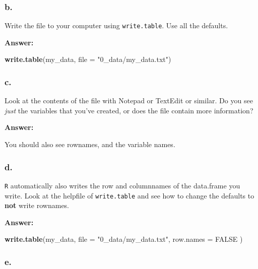\documentclass[]{article}
\newenvironment{Shaded}{\begin{snugshade}}{\end{snugshade}}
\newcommand{\DataTypeTok}[1]{\textcolor[rgb]{0.13,0.29,0.53}{#1}}
\newcommand{\KeywordTok}[1]{\textcolor[rgb]{0.13,0.29,0.53}{\textbf{#1}}}
\newcommand{\NormalTok}[1]{#1}
\newcommand{\OtherTok}[1]{\textcolor[rgb]{0.56,0.35,0.01}{#1}}
\newcommand{\StringTok}[1]{\textcolor[rgb]{0.31,0.60,0.02}{#1}}
\begin{document}
\hypertarget{b.-4}{%
\subsubsection{b.}\label{b.-4}}

Write the file to your computer using \texttt{write.table}. Use all the
defaults.

\textbf{Answer:}

\begin{Shaded}
\begin{Highlighting}[]
\KeywordTok{write.table}\NormalTok{(my_data, }\DataTypeTok{file =} \StringTok{"0_data/my_data.txt"}\NormalTok{)}
\end{Highlighting}
\end{Shaded}

\hypertarget{c.-4}{%
\subsubsection{c.}\label{c.-4}}

Look at the contents of the file with Notepad or TextEdit or similar. Do
you see \emph{just} the variables that you've created, or does the file
contain more information?

\textbf{Answer:}

You should also see rownames, and the variable names.

\hypertarget{d.-4}{%
\subsubsection{d.}\label{d.-4}}

\texttt{R} automatically also writes the row and columnnames of the
data.frame you write. Look at the helpfile of \texttt{write.table} and
see how to change the defaults to \textbf{not} write rownames.

\textbf{Answer:}

\begin{Shaded}
\begin{Highlighting}[]
\KeywordTok{write.table}\NormalTok{(my_data, }
            \DataTypeTok{file =} \StringTok{"0_data/my_data.txt"}\NormalTok{, }
            \DataTypeTok{row.names =} \OtherTok{FALSE}
\NormalTok{)}
\end{Highlighting}
\end{Shaded}

\hypertarget{e.-3}{%
\subsubsection{e.}\label{e.-3}}
\end{document}
